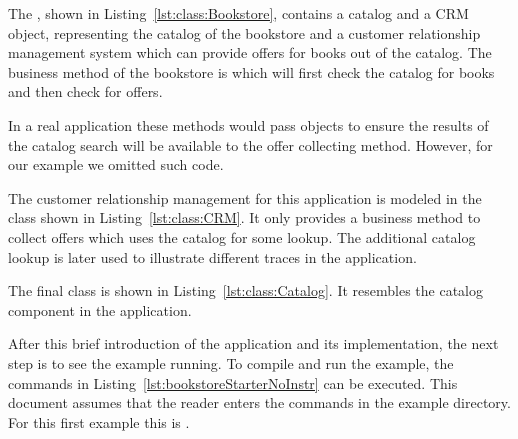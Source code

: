 \noindent The , shown in Listing~\ref{lst:class:Bookstore}, contains a catalog and a CRM object, representing the catalog of the bookstore and a customer relationship management system which can provide offers for books out of the catalog. The business method of the bookstore is  which will first check the catalog for books and then check for offers.

In a real application these methods would pass objects to ensure the results of the catalog search will be available to the offer collecting method. However, for our example we omitted such code. 



\noindent The customer relationship management for this application is modeled in the  class shown in Listing~\ref{lst:class:CRM}. It only provides a business method to collect offers which uses the catalog for some lookup. The additional catalog lookup is later used to illustrate different traces in the application.



\pagebreak

\noindent The final class is  shown in Listing~\ref{lst:class:Catalog}. It resembles the catalog component in the application.



\noindent After this brief introduction of the application and its implementation, the next step is to see the example running. To compile and run the example, the commands in Listing~\ref{lst:bookstoreStarterNoInstr} can be executed. This document assumes that the reader enters the commands in the example directory. For this first example this is .
\\


